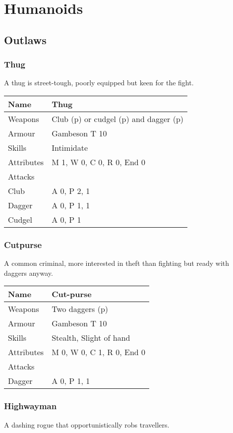 \documentclass[a4paper,11pt,oneside]{book}
\newcommand{\textlf}[1]{\textbf{\titlecap{#1}}}
\begin{document}
\section{Humanoids}

\subsection{Outlaws}

\subsubsection{Thug}
A thug is street-tough, poorly equipped but keen for the fight. 

\begin{tabular}{|l|l|}
	\hline
	Name & Thug\\
	\hline
	Weapons & Club (p) or cudgel (p) and dagger (p)\\
	Armour & Gambeson T 10\\
	Skills & Intimidate\\
	Attributes & M 1, W 0, C 0, R 0, End 0\\ 
	\hline
	Attacks & \\
	\hline
	Club & A 0, P 2, \textlf{penetration} 1\\
	Dagger & A 0, P 1, \textlf{Rending} 1 \\
	Cudgel & A 0, P 1\\ 
	\hline
\end{tabular}

\subsubsection{Cutpurse}
A common criminal, more interested in theft than fighting but ready with daggers anyway.

\begin{tabular}{|l|l|}
	\hline
	Name & Cut-purse\\
	\hline
	Weapons & Two daggers (p)\\
	Armour & Gambeson T 10\\
	Skills & Stealth, Slight of hand\\
	Attributes & M 0, W 0, C 1, R 0, End 0\\ 
	\hline
	Attacks & \\
	\hline
	Dagger & A 0, P 1, \textlf{Rending} 1 \\
	\hline
\end{tabular}

\subsubsection{Highwayman}
A dashing rogue that opportunistically robs travellers.
\end{document}

